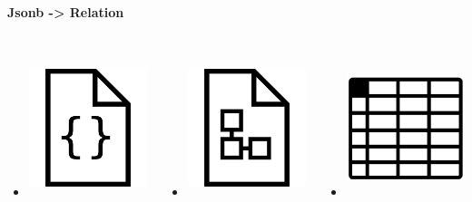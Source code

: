 \documentclass[usenames,dvipsnames, 18pt, compress, aspectratio=169]{beamer}
\begin{document}
\begin{frame}
    \frametitle{}
    \begin{center}
    \textbf{Jsonb -> Relation}

        \begin{columns}[T,onlytextwidth]
        \begin{itemize}[leftmargin=*]
            \item \includegraphics[width=4cm,height=4cm]{document.jpg}
        \end{itemize}

        \begin{itemize}[leftmargin=*]
            \item \includegraphics[width=4cm,height=4cm]{schema.jpg}
        \end{itemize}

        \begin{itemize}[leftmargin=*]
            \item \includegraphics[width=4cm,height=4cm]{relation.png}
        \end{itemize}

        \end{columns}

    \end{center}
\end{frame}
\end{document}
